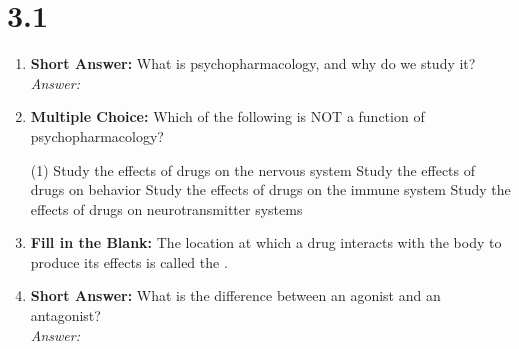 



\section*{3.1}
\begin{enumerate}[label=\textbf{Q3.1.\arabic*}]
    \item \textbf{Short Answer:} What is psychopharmacology, and why do we study it? \\
        \textit{Answer:} \\ %

    \item \textbf{Multiple Choice:} Which of the following is NOT a function of psychopharmacology?
        \begin{tasks}[label=\textcolor{\documentTheme}{(\Alph*)}, item-format=\color{\documentTheme}, label-width=1.5em, item-indent=1.7em](1)
            \task Study the effects of drugs on the nervous system
            \task Study the effects of drugs on behavior
            \task Study the effects of drugs on the immune system
            \task Study the effects of drugs on neurotransmitter systems
        \end{tasks}

    \item \textbf{Fill in the Blank:} The location at which a drug interacts with the body to produce its effects is called the \underline{\hspace{3cm}}.

    \item \textbf{Short Answer:} What is the difference between an agonist and an antagonist? \\
        \textit{Answer:} \\%


\end{enumerate}
